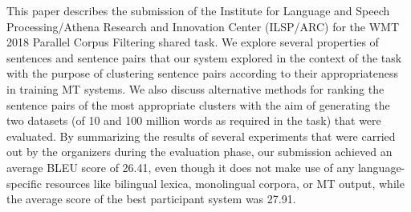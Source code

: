 This paper describes the submission of the Institute for Language and Speech Processing/Athena Research and Innovation Center (ILSP/ARC) for the WMT 2018 Parallel Corpus Filtering shared task. We explore several properties of sentences and sentence pairs that our system explored in the context of the task with the purpose of clustering sentence pairs according to their appropriateness in training MT systems. We also discuss alternative methods for ranking the sentence pairs of the most appropriate clusters with the aim of generating the two datasets (of 10 and 100 million words as required in the task) that were evaluated. By summarizing the results of several experiments that were carried out by the organizers during the evaluation phase, our submission achieved an average BLEU score of 26.41, even though it does not make use of any language-specific resources like bilingual lexica, monolingual corpora, or MT output, while the average score of the best participant system was 27.91.
